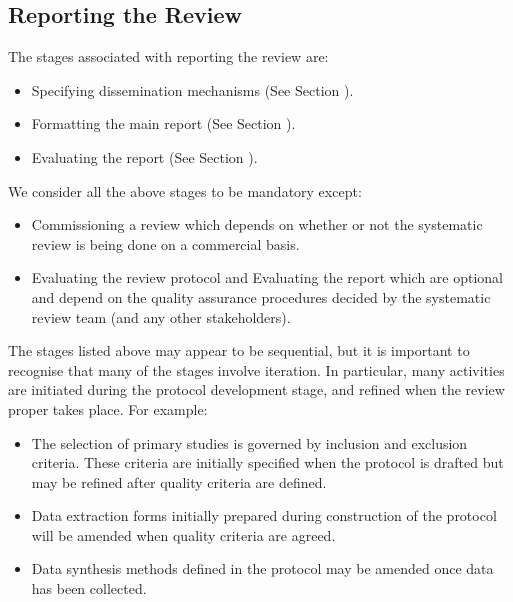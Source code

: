 \subsection{Reporting the Review}
The stages associated with reporting the review are:
\begin{itemize}
	\item Specifying dissemination mechanisms (See Section ).
	\item Formatting the main report (See Section ).
	\item Evaluating the report (See Section ).
\end{itemize}

We consider all the above stages to be mandatory except:
\begin{itemize}
	\item Commissioning a review which depends on whether or not the systematic review is being done on a
	      commercial basis.
	\item Evaluating the review protocol and Evaluating the report which are optional and depend on the
	      quality assurance procedures decided by the systematic review team (and any other stakeholders).
\end{itemize}

The stages listed above may appear to be sequential, but it is important to recognise that many of
the stages involve iteration. In particular, many activities are initiated during the protocol
development stage, and refined when the review proper takes place. For example:
\begin{itemize}
	\item The selection of primary studies is governed by inclusion and exclusion criteria. These criteria
	      are initially specified when the protocol is drafted but may be refined after quality criteria are
	      defined.
	\item Data extraction forms initially prepared during construction of the protocol will be amended when
	      quality criteria are agreed.
	\item Data synthesis methods defined in the protocol may be amended once data has been collected.
\end{itemize}
